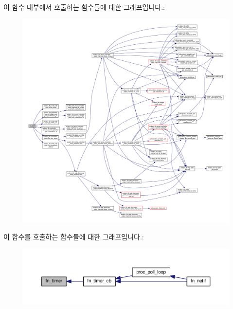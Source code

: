 이 함수 내부에서 호출하는 함수들에 대한 그래프입니다.\+:
\nopagebreak
\begin{figure}[H]
\begin{center}
\leavevmode
\includegraphics[width=350pt]{classavdecc__lib_1_1system__layer2__multithreaded__callback_a31827beb4f4d9ee65747b3d7df4f9369_cgraph}
\end{center}
\end{figure}




이 함수를 호출하는 함수들에 대한 그래프입니다.\+:
\nopagebreak
\begin{figure}[H]
\begin{center}
\leavevmode
\includegraphics[width=350pt]{classavdecc__lib_1_1system__layer2__multithreaded__callback_a31827beb4f4d9ee65747b3d7df4f9369_icgraph}
\end{center}
\end{figure}


